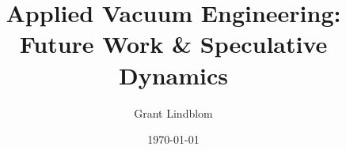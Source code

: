 \documentclass[11pt, letterpaper, openright]{book}
\begin{document}
\frontmatter

\title{Applied Vacuum Engineering: Future Work \& Speculative Dynamics}
\author{Grant Lindblom}
\date{\today}
\maketitle

\tableofcontents

\mainmatter

\setcounter{chapter}{0}











\backmatter



\end{document}

